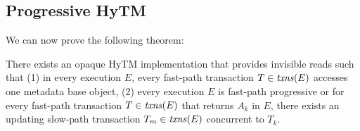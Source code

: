 \subsection{Progressive HyTM}
\label{sec:hytm2}
%
We can now prove the following theorem:
%
\begin{theorem}
\label{th:inswrite2}
There exists an opaque HyTM implementation that provides invisible reads
such that (1) in every execution $E$,
every fast-path transaction $T\in \ms{txns}(E)$
accesses one metadata base object,
(2) every execution $E$ is fast-path progressive or for
every fast-path transaction $T\in \ms{txns}(E)$
that returns $A_k$ in $E$, there exists an updating slow-path transaction $T_m \in \ms{txns}(E)$
concurrent to $T_k$.
\end{theorem}
%
\begin{proofsketch}
% 
\end{proofsketch}
%